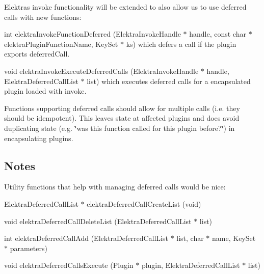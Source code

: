 \begin{DoxyItemize}
\item Elektra\textquotesingle{}s invoke functionality will be extended to also allow us to use deferred calls with new functions\+:
\item {\ttfamily int elektra\+Invoke\+Function\+Deferred (Elektra\+Invoke\+Handle $\ast$ handle, const char $\ast$ elektra\+Plugin\+Function\+Name, Key\+Set $\ast$ ks)} which defers a call if the plugin exports {\ttfamily deferred\+Call}.
\item {\ttfamily void elektra\+Invoke\+Execute\+Deferred\+Calls (Elektra\+Invoke\+Handle $\ast$ handle, Elektra\+Deferred\+Call\+List $\ast$ list)} which executes deferred calls for a encapsulated plugin loaded with invoke.
\item Functions supporting deferred calls should allow for multiple calls (i.\+e. they should be idempotent). This leaves state at affected plugins and does avoid duplicating state (e.\+g. \char`\"{}was this function called for this plugin before?\char`\"{}) in encapsulating plugins.
\end{DoxyItemize}

\subsection*{Notes}

Utility functions that help with managing deferred calls would be nice\+:


\begin{DoxyItemize}
\item {\ttfamily Elektra\+Deferred\+Call\+List $\ast$ elektra\+Deferred\+Call\+Create\+List (void)}
\item {\ttfamily void elektra\+Deferred\+Call\+Delete\+List (Elektra\+Deferred\+Call\+List $\ast$ list)}
\item {\ttfamily int elektra\+Deferred\+Call\+Add (Elektra\+Deferred\+Call\+List $\ast$ list, char $\ast$ name, Key\+Set $\ast$ parameters)}
\item {\ttfamily void elektra\+Deferred\+Calls\+Execute (Plugin $\ast$ plugin, Elektra\+Deferred\+Call\+List $\ast$ list)} 
\end{DoxyItemize}